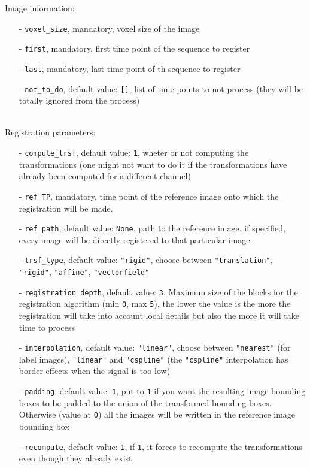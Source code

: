 \documentclass[10pt,a4paper]{article}
\begin{document}
Image information:
\begin{itemize}
\item[-] \texttt{voxel\_size}, mandatory, voxel size of the image
\item[-] \texttt{first}, mandatory, first time point of the sequence to register
\item[-] \texttt{last}, mandatory, last time point of th sequence to register
\item[-] \texttt{not\_to\_do}, default value: \texttt{[]}, list of time points to not process (they will be totally ignored from the process)
\end{itemize}~\\
Registration parameters:
\begin{itemize}
\item[-] \texttt{compute\_trsf}, default value: \texttt{1}, wheter or not computing the transformations (one might not want to do it if the transformations have already been computed for a different channel)
\item[-] \texttt{ref\_TP}, mandatory, time point of the reference image onto which the registration will be made.
\item[-] \texttt{ref\_path}, default value: \texttt{None}, path to the reference image, if specified, every image will be directly registered to that particular image
\item[-] \texttt{trsf\_type}, default value: \texttt{"rigid"}, choose between \texttt{"translation"}, \texttt{"rigid"}, \texttt{"affine"}, \texttt{"vectorfield"}
\item[-] \texttt{registration\_depth}, default value: \texttt{3}, Maximum size of the blocks for the registration algorithm (min \texttt{0}, max \texttt{5}), the lower the value is the more the registration will take into account local details but also the more it will take time to process
\item[-] \texttt{interpolation}, default value: \texttt{"linear"}, choose between \texttt{"nearest"} (for label images), \texttt{"linear"} and \texttt{"cspline"} (the \texttt{"cspline"} interpolation has border effects when the signal is too low)
\item[-] \texttt{padding}, default value: \texttt{1}, put to \texttt{1} if you want the resulting image bounding boxes to be padded to the union of the transformed bounding boxes. Otherwise (value at \texttt{0}) all the images will be written in the reference image bounding box
\item[-] \texttt{recompute}, default value: \texttt{1}, if \texttt{1}, it forces to recompute the transformations even though they already exist

\end{itemize}
\end{document}
